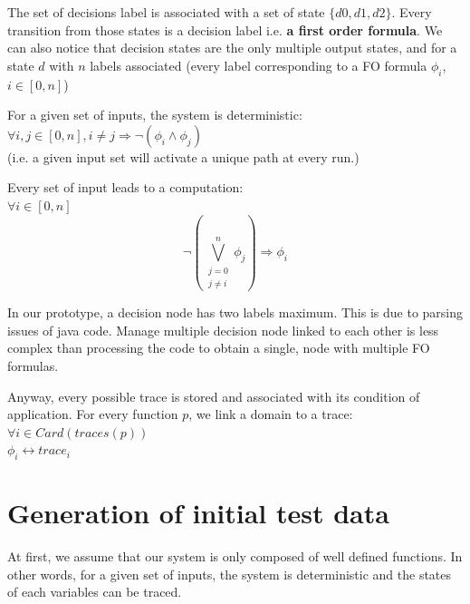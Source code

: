 \documentclass[a4paper]{report}
\begin{document}
\begin{NB}
The set of decisions label is associated with a set of state $\{d0, d1, d2\}$. Every transition from those states is a decision label i.e. \textbf{a first order formula}. We can also notice that decision states are the only multiple output states, and for a state $d$ with $n$ labels associated (every label corresponding to a FO formula $\phi_i$, $i\in[0, n]$)\\
\newline

\begin{lemma}
For a given set of inputs, the system is deterministic:\\
$\forall i, j \in [0, n], i \neq j \Rightarrow \neg (\phi_i \wedge \phi_j)$\\
(i.e. a given input set will activate a unique path at every run.)
\end{lemma}

\begin{lemma}
Every set of input leads to a computation:\\
$\forall i \in [0, n] $\\
\[\displaystyle \neg (\bigvee_{\substack{j=0 \\ j \neq i}}^{n} \phi_j) \Rightarrow \phi_i \]
\end{lemma}

\end{NB}


\begin{remark}
In our prototype, a decision node has two labels maximum. This is due to parsing issues of java code. Manage multiple decision node linked to each other is less complex than processing the code to obtain a single, node with multiple FO formulas.\\
\end{remark}
Anyway, every possible trace is stored and associated with its condition of application. For every function $p$, we link a domain to a trace:\\ $\forall i \in Card(traces(p))$\\
$\phi_i \leftrightarrow trace_i$\\


\section*{Generation of initial test data}
At first, we assume that our system is only composed of well defined functions. In other words, for a given set of inputs, the system is deterministic and the states of each variables can be traced.\\
\end{document}
